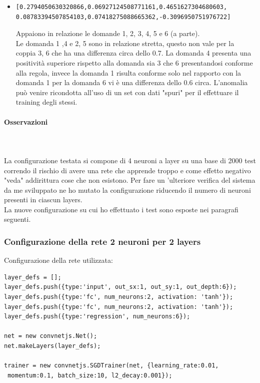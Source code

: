 \begin{itemize}
\item  \begin{verbatim}[0.2794050630320866,0.06927124508771161,0.4651627304680603,
0.08783394507854103,0.07418275088665362,-0.3096950751976722]\end{verbatim}
Appaiono in relazione le domande 1, 2, 3, 4, 5  e 6 (a parte).\\
Le domanda 1 ,4 e 2, 5  sono in relazione stretta, questo non vale per la coppia 3, 6 che ha una differenza circa dello 0.7. La domanda 4 presenta una positivit\`a superiore rispetto alla domanda sia 3 che 6 presentandosi conforme alla regola, invece la domanda 1 risulta conforme solo nel rapporto con la domanda 1 per la domanda 6 vi \`e una differenza dello 0.6 circa. L'anomalia pu\`o venire ricondotta all'uso di un set con dati "spuri" per il effettuare il training degli stessi.
\end{itemize}

\paragraph{Osservazioni}\mbox{}
\label{Osservazioni su rete a 4 neuroni}
\\\\
\noindent
La configurazione testata si compone di 4 neuroni a layer su una base di 2000 test correndo il rischio di avere una rete che apprende troppo e come effetto negativo "veda" addirittura cose che non esistono.
Per fare un 'ulteriore verifica del sistema da me sviluppato ne ho mutato la configurazione riducendo il numero di neuroni presenti in ciascun layers.\\
La nuove configurazione su cui ho effettuato i test sono esposte nei paragrafi seguenti.

\subsubsection{Configurazione della rete 2 neuroni per 2 layers}
\label{Configurazione della rete 2 neuroni per 2 layers}
Configurazione della rete utilizzata:\\
\begin{verbatim}layer_defs = [];
layer_defs.push({type:'input', out_sx:1, out_sy:1, out_depth:6});
layer_defs.push({type:'fc', num_neurons:2, activation: 'tanh'});
layer_defs.push({type:'fc', num_neurons:2, activation: 'tanh'});
layer_defs.push({type:'regression', num_neurons:6});

net = new convnetjs.Net();
net.makeLayers(layer_defs);

trainer = new convnetjs.SGDTrainer(net, {learning_rate:0.01,
 momentum:0.1, batch_size:10, l2_decay:0.001});
\end{verbatim}

